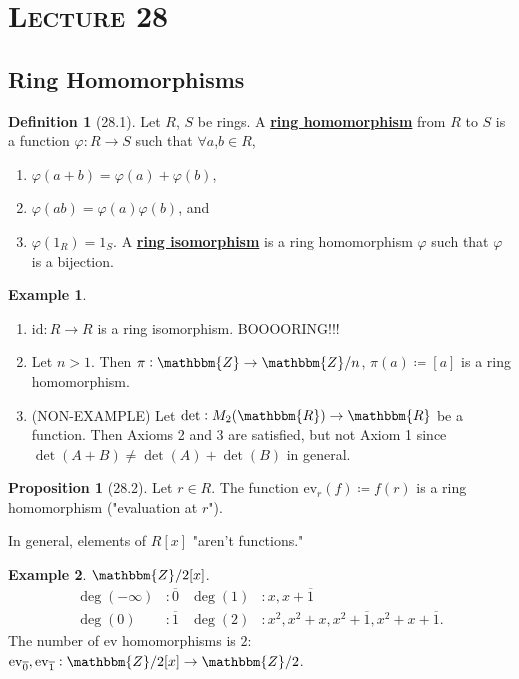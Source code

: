\documentclass{article}
\newcommand{\Z}{\mathbbm{Z}}
\newcommand{\R}{\mathbbm{R}}
\newcommand{\coleq}{\coloneqq}
\newcommand{\id}{\mathrm{id}}
\newcommand{\define}[1]{\textbf{\underline{#1}}}
\newcommand{\func}[3]{#1: #2 \to #3}
\theoremstyle{definition}
\newtheorem*{defn}{Definition}
\newtheorem*{prop}{Proposition}
\newtheorem*{ex}{Example}
\theoremstyle{remark}
\newcommand{\ev}{\mathrm{ev}}
\begin{document}
    \section*{\textbf{\textsc{Lecture 28}}}{
        \subsection*{Ring Homomorphisms}{
            \begin{defn}[28.1]
                Let $R$, $S$ be rings. A \define{ring homomorphism} from $R$ to $S$ is a function $\func{\varphi}{R}{S}$ such that $\forall a$,$b \in R$,
                \begin{enumerate}
                    \item $\varphi(a+b)=\varphi(a)+\varphi(b)$,
                    \item $\varphi(ab)=\varphi(a)\varphi(b)$, and
                    \item $\varphi(1_R)=1_S$.
                A \define{ring isomorphism} is a ring homomorphism $\varphi$ such that $\varphi$ is a bijection.
                \end{enumerate}
            \end{defn}
            
            \begin{ex}
                \begin{enumerate}
                    \item $\func{\id}{R}{R}$ is a ring isomorphism. BOOOORING!!!
                    \item Let $n>1$. Then $\func{\pi}{\Z}{\Z/n}$, $\pi(a)\coleq[a]$ is a ring homomorphism.
                    \item (NON-EXAMPLE) Let $\func{\det}{M_2(\R)}{\R}$ be a function. Then Axioms 2 and 3 are satisfied, but not Axiom 1 since $\det(A+B)\neq \det(A)+\det(B)$ in general.
                \end{enumerate}
            \end{ex}
            
            \begin{prop}[28.2]
                Let $r \in R$. The function $\ev_r(f)\coleq f(r)$ is a ring homomorphism ("evaluation at $r$").
            \end{prop}
            
            In general, elements of $R[x]$ "aren't functions."
            
            \begin{ex}
                $\Z/2[x]$.
                \begin{align*}
                    \deg(-\infty)&: \overline{0}   &    \deg(1)&: x,x+\overline{1}\\
                    \deg(0)&: \overline{1}   &   \deg(2)&: x^2,x^2+x,x^2+\overline{1},x^2+x+\overline{1}.
                \end{align*}
                The number of $\ev$ homomorphisms is $2$: $\func{\ev_{\overline{0}},\ev_{\overline{1}}}{\Z/2[x]}{\Z/2}$.\\
                

\end{ex}}}
\end{document}
